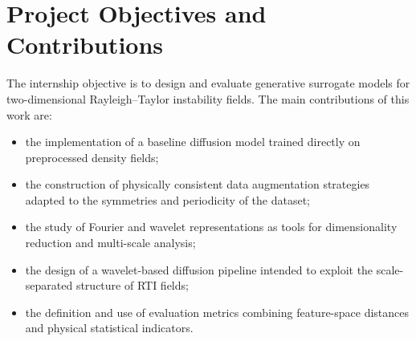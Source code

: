 \section{Project Objectives and Contributions}

The internship objective is to design and evaluate generative surrogate models for two-dimensional Rayleigh--Taylor instability fields. The main contributions of this work are:
\begin{itemize}
\item the implementation of a baseline diffusion model trained directly on preprocessed density fields;
\item the construction of physically consistent data augmentation strategies adapted to the symmetries and periodicity of the dataset;
\item the study of Fourier and wavelet representations as tools for dimensionality reduction and multi-scale analysis;
\item the design of a wavelet-based diffusion pipeline intended to exploit the scale-separated structure of RTI fields;
\item the definition and use of evaluation metrics combining feature-space distances and physical statistical indicators.
\end{itemize}

